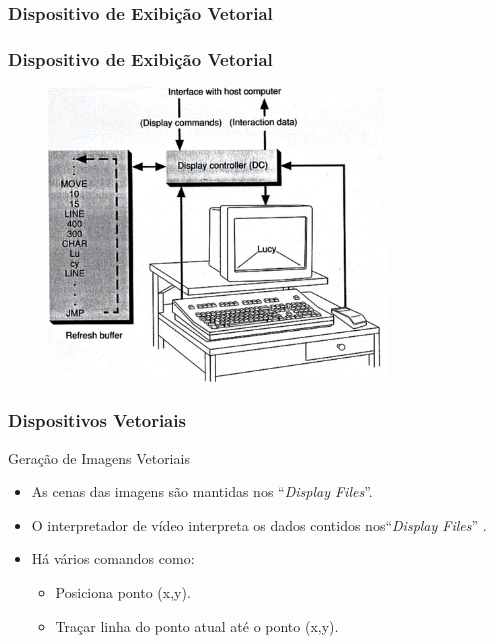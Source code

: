 \documentclass{beamer}
\begin{document}
\subsubsection{Dispositivo de Exibição Vetorial}
\begin{frame}
\frametitle{Dispositivo de Exibição Vetorial}

	\begin{figure}[!h]
		\begin{center}
			\includegraphics[width=0.8\textwidth]{Figures/vecDisp}
		\end{center}
		
	\end{figure}

\end{frame}


\begin{frame}
\frametitle{Dispositivos Vetoriais}
	
	\begin{block}{Geração de Imagens Vetoriais }
		\begin{itemize}
			\item As cenas das imagens são mantidas nos ``\textit{Display Files}''.
			\item O interpretador de vídeo interpreta os dados contidos nos``\textit{Display Files}'' .
			\item Há vários comandos como:
				\begin{itemize}
					\item Posiciona ponto (x,y).
					\item Traçar linha do ponto atual até o ponto (x,y).
				\end{itemize}
		\end{itemize}
	\end{block}

\end{frame}
\end{document}
